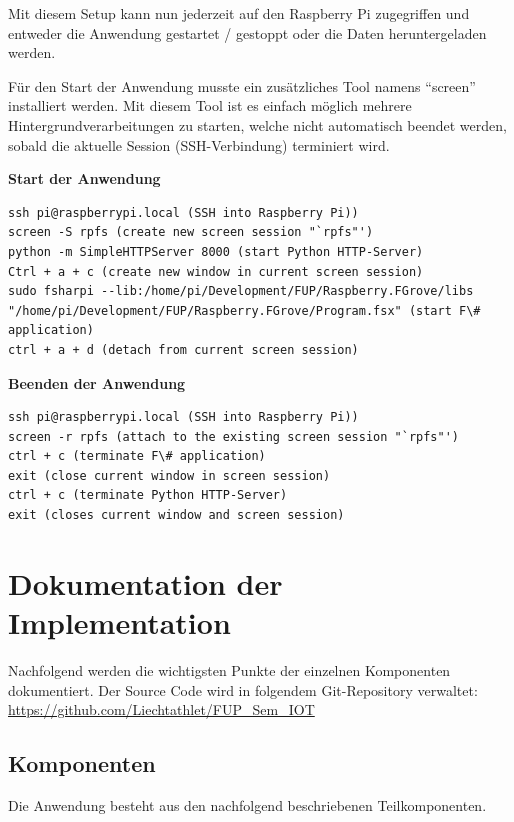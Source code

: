 Mit diesem Setup kann nun jederzeit auf den Raspberry Pi zugegriffen und entweder die Anwendung gestartet / gestoppt oder die Daten heruntergeladen werden.

Für den Start der Anwendung musste ein zusätzliches Tool namens "`screen"' installiert werden. Mit diesem Tool ist es einfach möglich mehrere Hintergrundverarbeitungen zu starten, welche nicht automatisch beendet werden, sobald die aktuelle Session (SSH-Verbindung) terminiert wird.

\textbf{Start der Anwendung}
\begin{lstlisting}
ssh pi@raspberrypi.local (SSH into Raspberry Pi))
screen -S rpfs (create new screen session "`rpfs"')
python -m SimpleHTTPServer 8000 (start Python HTTP-Server)
Ctrl + a + c (create new window in current screen session)
sudo fsharpi --lib:/home/pi/Development/FUP/Raspberry.FGrove/libs "/home/pi/Development/FUP/Raspberry.FGrove/Program.fsx" (start F\# application)
ctrl + a + d (detach from current screen session)
\end{lstlisting}

\textbf{Beenden der Anwendung}
\begin{lstlisting}
ssh pi@raspberrypi.local (SSH into Raspberry Pi))
screen -r rpfs (attach to the existing screen session "`rpfs"')
ctrl + c (terminate F\# application)
exit (close current window in screen session)
ctrl + c (terminate Python HTTP-Server)
exit (closes current window and screen session)
\end{lstlisting}

\section{Dokumentation der Implementation}
\label{sec:AnalyseCollection:ImplDoc}
Nachfolgend werden die wichtigsten Punkte der einzelnen Komponenten dokumentiert. Der Source Code wird in folgendem Git-Repository verwaltet: \url{https://github.com/Liechtathlet/FUP_Sem_IOT}

\subsection{Komponenten}
Die Anwendung besteht aus den nachfolgend beschriebenen Teilkomponenten.

